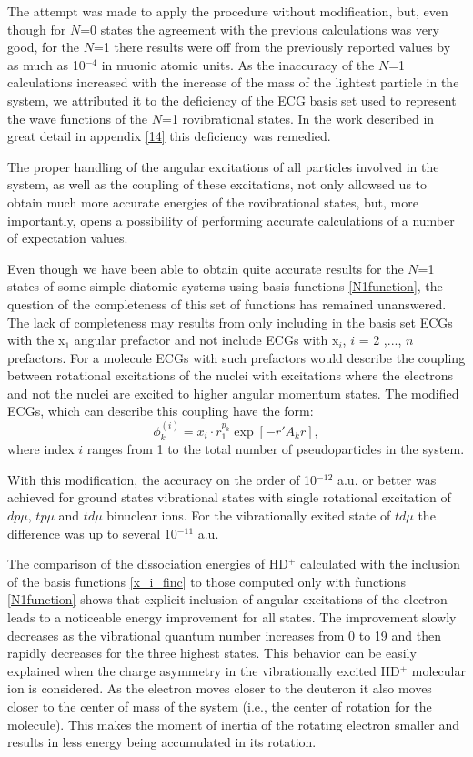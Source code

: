 The attempt was  made to apply the procedure without modification, but, even though 
for $N$=0 states the agreement with the previous calculations was very good, 
for the $N$=1 there results were off from the previously reported values by 
as much as 10$^{−4}$ in muonic atomic units.
As the inaccuracy of the $N$=1 calculations increased with the increase of the 
mass of the lightest particle in the system, we attributed it to the deficiency 
of the ECG basis set used to represent the wave functions of the $N$=1 
rovibrational states. In the work described in great detail in appendix \ref{14} 
this deficiency was remedied.

The proper handling of the angular excitations of all particles involved in the 
system, as well as the coupling of these excitations, not only allowsed us to obtain 
much more accurate energies of the rovibrational states, but, more importantly,
opens a possibility of performing accurate calculations of a number of expectation 
values.

Even though we have been able to obtain quite accurate results for the $N$=1 states 
of some simple diatomic systems using basis functions \ref{N1function}, the question 
of the completeness of this set of functions has remained unanswered. The lack of 
completeness may results from only including in the basis set ECGs with the x$_1$ 
angular prefactor and not include ECGs with x$_i$, $i$ = 2 ,$...$, $n$ prefactors. 
For a molecule ECGs with such prefactors would describe the coupling between rotational 
excitations of the nuclei with excitations where the electrons and not the nuclei 
are excited to higher angular momentum states. The modified ECGs, which can describe 
this coupling have the form:
\begin{equation}
\phi_k^{(i)} = x_i \cdot r_1^{p_k} \exp [-r'A_k r],
\label{x_i_finc}
\end{equation}
where index $i$ ranges from 1 to the total number of pseudoparticles in the system.

With this modification, the accuracy on the order of 10$^{-12}$ a.u. or better was achieved
for ground states vibrational states with single rotational excitation of 
$dp\mu$, $tp\mu$ and $td\mu$ binuclear ions. For the vibrationally exited state 
of $td\mu$ the difference was up to several 10$^{-11}$ a.u.

The comparison of the dissociation energies of HD$^+$ calculated with the
inclusion of the basis functions \ref{x_i_finc} to those computed only with 
functions \ref{N1function} shows that explicit inclusion of angular excitations 
of the electron leads to a noticeable energy improvement for all states.
The improvement slowly decreases as the vibrational quantum number increases 
from 0 to 19 and then rapidly decreases for the three highest states. 
This behavior can be easily explained when the charge asymmetry in the 
vibrationally excited HD$^+$ molecular ion is considered.
As the electron moves closer to the deuteron it also moves closer to the 
center of mass of the system (i.e., the center of rotation for the molecule). 
This makes the moment of inertia of the rotating electron smaller and results 
in less energy being accumulated in its rotation.

